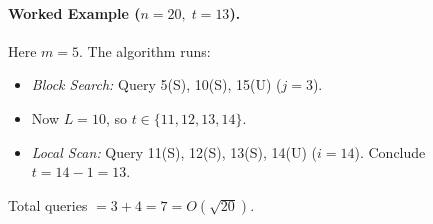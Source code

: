 \documentclass[12pt]{article}
\begin{document}
	\paragraph{Worked Example ($n=20,\;t=13$).}
	Here $m=5$. The algorithm runs:
	\begin{itemize}
		\item \emph{Block Search:} Query 5(S), 10(S), 15(U) \quad($j=3$).
		\item Now $L=10$, so $t\in\{11,12,13,14\}$.
		\item \emph{Local Scan:} Query 11(S), 12(S), 13(S), 14(U) \quad($i=14$). Conclude $t=14-1=13$.
	\end{itemize}
	Total queries $=3+4=7=O(\sqrt{20})$.
	
\end{document}
